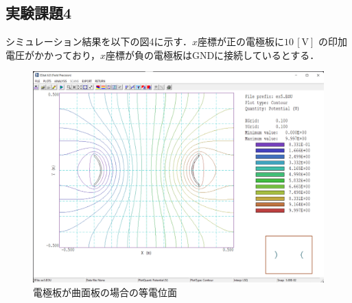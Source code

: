 \subsection{実験課題4}
シミュレーション結果を以下の図4に示す．$x$座標が正の電極板に$10\,[\si{\volt}]$
の印加電圧がかかっており，$x$座標が負の電極板はGNDに接続しているとする．
\begin{figure}[H]
    \begin{center}
        \includegraphics[scale=0.5]{figure4.pdf}
        \caption{電極板が曲面板の場合の等電位面}
    \end{center}
\end{figure}
\newpage
